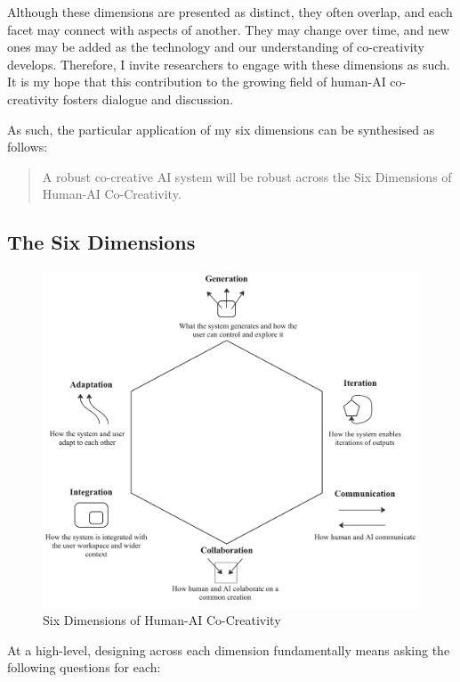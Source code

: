 Although these dimensions are presented as distinct, they often overlap, and each facet may connect with aspects of another. They may change over time, and new ones may be added as the technology and our understanding of co-creativity develops. Therefore, I invite researchers to engage with these dimensions as such. It is my hope that this contribution to the growing field of human-AI co-creativity fosters dialogue and discussion. 

As such, the particular application of my six dimensions can be synthesised as follows: 

\begin{quote}
A robust co-creative AI system will be robust across the Six Dimensions of Human-AI Co-Creativity. 
\end{quote}

\subsection{The Six Dimensions}

\begin{figure}
    \centering
    \includegraphics[width=1\linewidth]{sixdimensions.png}
    \caption{Six Dimensions of Human-AI Co-Creativity}
    \label{fig:sixdim}
\end{figure}

At a high-level, designing across each dimension fundamentally means asking the following questions for each:

